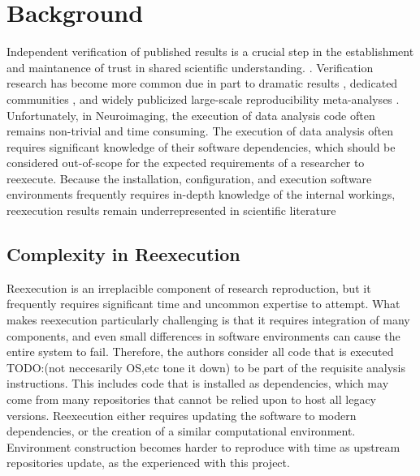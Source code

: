 \section{Background}

Independent verification of published results is a crucial step in the establishment and maintanence of trust in shared scientific understanding. \cite{TODO Too corny to cite Kuhn?}.
Verification research has become more common due in part to dramatic results \cite{TODO: Salmon}, dedicated communities \cite{TODO: something wholesome}, and widely publicized large-scale reproducibility meta-analyses \cite{RPP}.
Unfortunately, in Neuroimaging, the execution of data analysis code often remains non-trivial and time consuming. \cite{TODO: I made this up} 
The execution of data analysis often requires significant knowledge of their software dependencies, which should be considered out-of-scope for the expected requirements of a researcher to reexecute.
Because the installation, configuration, and execution software environments frequently requires in-depth knowledge of the internal workings, reexecution results remain underrepresented in scientific literature \cite{TODO my opinion, is that ok?}

\subsection{Complexity in Reexecution}

Reexecution is an irreplacible component of research reproduction, but it frequently requires significant time and uncommon expertise to attempt.
What makes reexecution particularly challenging is that it requires integration of many components, and even small differences in software environments can cause the entire system to fail.
Therefore, the authors consider all code that is executed TODO:(not neccesarily OS,etc tone it down) to be part of the requisite analysis instructions.
This includes code that is installed as dependencies, which may come from many repositories that cannot be relied upon to host all legacy versions.
Reexecution either requires updating the software to modern dependencies, or the creation of a similar computational environment.
Environment construction becomes harder to reproduce with time as upstream repositories update, as the experienced with this project.

